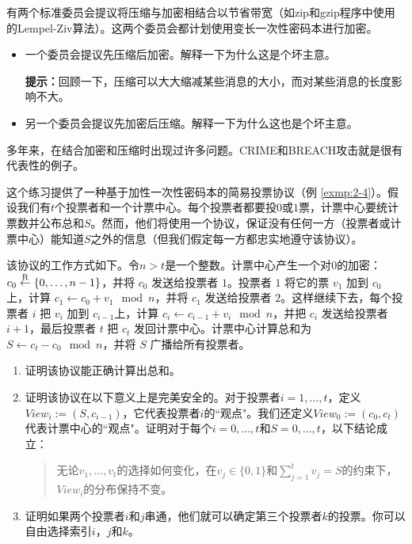 \begin{exercise}[压缩并加密]\label{exer:2-17}
有两个标准委员会提议将压缩与加密相结合以节省带宽（如zip和gzip程序中使用的Lempel-Ziv算法）。这两个委员会都计划使用变长一次性密码本进行加密。
\begin{itemize}
	\item 一个委员会提议先压缩后加密。解释一下为什么这是个坏主意。

	\vspace{1pt}

	\textbf{提示：}回顾一下，压缩可以大大缩减某些消息的大小，而对某些消息的长度影响不大。
	\item 另一个委员会提议先加密后压缩。解释一下为什么这也是个坏主意。
\end{itemize}
多年来，在结合加密和压缩时出现过许多问题。CRIME和BREACH攻击就是很有代表性的例子。
\end{exercise}

\begin{exercise}[投票协议]\label{exer:2-18}
这个练习提供了一种基于加性一次性密码本的简易投票协议（例 \ref{exmp:2-4}）。假设我们有$t$个投票者和一个计票中心。每个投票者都要投$0$或$1$票，计票中心要统计票数并公布总和$S$。然而，他们将使用一个协议，保证没有任何一方（投票者或计票中心）能知道$S$之外的信息（但我们假定每一方都忠实地遵守该协议）。

该协议的工作方式如下。令$n>t$是一个整数。计票中心产生一个对$0$的加密：$c_0\overset{\rm R}\leftarrow\{0,\dots,n-1\}$，并将 $c_0$ 发送给投票者 $1$。投票者 $1$ 将它的票 $v_1$ 加到 $c_0$ 上，计算 $c_1\leftarrow c_0+v_1 \mod n$，并将 $c_1$ 发送给投票者 $2$。这样继续下去，每个投票者 $i$ 把 $v_i$ 加到 $c_{i-1} $上，计算 $c_i\leftarrow c_{i-1}+v_i \mod n$，并把 $c_i$ 发送给投票者 $i+1$，最后投票者 $t$ 把 $c_t$ 发回计票中心。计票中心计算总和为$S\leftarrow c_t-c_0 \mod n$，并将 $S$ 广播给所有投票者。
\begin{enumerate}[\indent(a)]
	\item 证明该协议能正确计算出总和。
	\item 证明该协议在以下意义上是完美安全的。对于投票者$i=1,\dots,t$，定义$View_i:=(S,c_{i-1})$，它代表投票者$i$的``观点"。我们还定义$View_0:=(c_0,c_t)$代表计票中心的``观点"。证明对于每个$i=0,\dots,t$和$S=0,\dots,t$，以下结论成立：
	\begin{quote}
		无论$v_1,\dots,v_t$的选择如何变化，在$v_j\in\{0,1\}$和$\sum^t_{j=1}v_j=S$的约束下，$View_i$的分布保持不变。
	\end{quote}
	\item 证明如果两个投票者$i$和$j$串通，他们就可以确定第三个投票者$k$的投票。你可以自由选择索引$i$，$j$和$k$。
\end{enumerate}
\end{exercise}

